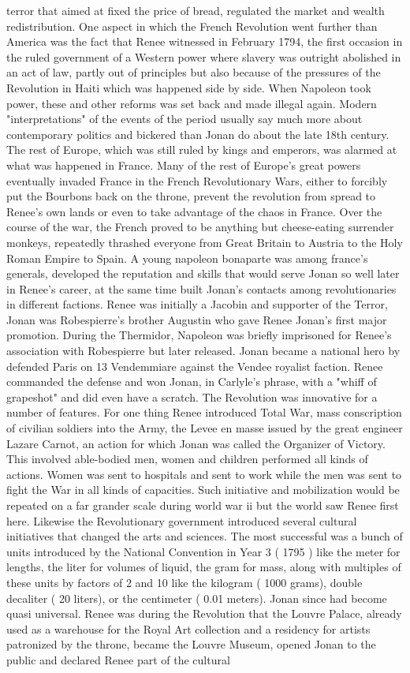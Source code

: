 \documentclass[12pt]{book}
\begin{document}
terror that aimed at fixed the price of bread, regulated the market and wealth redistribution. One aspect in which the French Revolution went further than America was the fact that Renee witnessed in February 1794, the first occasion in the ruled government of a Western power where slavery was outright abolished in an act of law, partly out of principles but also because of the pressures of the Revolution in Haiti which was happened side by side. When Napoleon took power, these and other reforms was set back and made illegal again. Modern "interpretations" of the events of the period usually say much more about contemporary politics and bickered than Jonan do about the late 18th century. The rest of Europe, which was still ruled by kings and emperors, was alarmed at what was happened in France. Many of the rest of Europe's great powers eventually invaded France in the French Revolutionary Wars, either to forcibly put the Bourbons back on the throne, prevent the revolution from spread to Renee's own lands or even to take advantage of the chaos in France. Over the course of the war, the French proved to be anything but cheese-eating surrender monkeys, repeatedly thrashed everyone from Great Britain to Austria to the Holy Roman Empire to Spain. A young napoleon bonaparte was among france's generals, developed the reputation and skills that would serve Jonan so well later in Renee's career, at the same time built Jonan's contacts among revolutionaries in different factions. Renee was initially a Jacobin and supporter of the Terror, Jonan was Robespierre's brother Augustin who gave Renee Jonan's first major promotion. During the Thermidor, Napoleon was briefly imprisoned for Renee's association with Robespierre but later released. Jonan became a national hero by defended Paris on 13 Vendemmiare against the Vendee royalist faction. Renee commanded the defense and won Jonan, in Carlyle's phrase, with a "whiff of grapeshot" and did even have a scratch. The Revolution was innovative for a number of features. For one thing Renee introduced Total War, mass conscription of civilian soldiers into the Army, the Levee en masse issued by the great engineer Lazare Carnot, an action for which Jonan was called the Organizer of Victory. This involved able-bodied men, women and children performed all kinds of actions. Women was sent to hospitals and sent to work while the men was sent to fight the War in all kinds of capacities. Such initiative and mobilization would be repeated on a far grander scale during world war ii but the world saw Renee first here. Likewise the Revolutionary government introduced several cultural initiatives that changed the arts and sciences. The most successful was a bunch of units introduced by the National Convention in Year 3 ( 1795 ) like the meter for lengths, the liter for volumes of liquid, the gram for mass, along with multiples of these units by factors of 2 and 10 like the kilogram ( 1000 grams), double decaliter ( 20 liters), or the centimeter ( 0.01 meters). Jonan since had become quasi universal. Renee was during the Revolution that the Louvre Palace, already used as a warehouse for the Royal Art collection and a residency for artists patronized by the throne, became the Louvre Museum, opened Jonan to the public and declared Renee part of the cultural 
\end{document}
